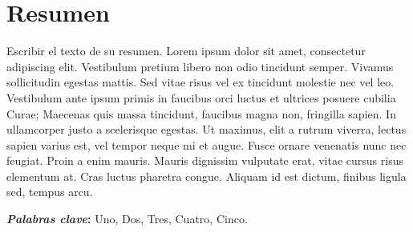 \chapter*{\hfill{\centering Resumen}\hfill}
\vspace{0.5cm}
\justify
\normalsize

Escribir el texto de su resumen. Lorem ipsum dolor sit amet, consectetur adipiscing elit. Vestibulum pretium libero non odio tincidunt semper. Vivamus sollicitudin egestas mattis. Sed vitae risus vel ex tincidunt molestie nec vel leo. Vestibulum ante ipsum primis in faucibus orci luctus et ultrices posuere cubilia Curae; Maecenas quis massa tincidunt, faucibus magna non, fringilla sapien. In ullamcorper justo a scelerisque egestas. Ut maximus, elit a rutrum viverra, lectus sapien varius est, vel tempor neque mi et augue. Fusce ornare venenatis nunc nec feugiat. Proin a enim mauris. Mauris dignissim vulputate erat, vitae cursus risus elementum at. Cras luctus pharetra congue. Aliquam id est dictum, finibus ligula sed, tempus arcu. 

\vspace{0.5cm}
\raggedright 
{\bf \textit{Palabras clave}:} Uno, Dos, Tres, Cuatro, Cinco.
